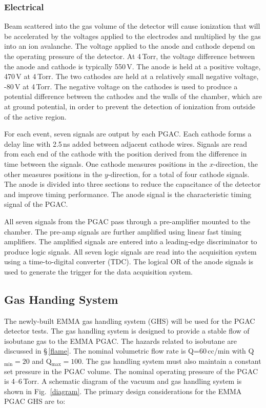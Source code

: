 \subsubsection{Electrical}
Beam scattered into the gas volume of the detector will cause ionization that will be accelerated by the %
 voltages applied to the electrodes and multiplied by the gas into an ion avalanche.
The  voltage applied to the anode and cathode depend on the operating pressure of the detector.  At 4\,Torr, the voltage difference between the anode and cathode is typically 550\,V.  The anode is held at a positive voltage, 470\,V at 4\,Torr.  The two cathodes are held at a relatively small negative voltage, -80\,V at 4\,Torr.  The negative voltage on the cathodes is used to produce a potential difference between the cathodes and the walls of the chamber, which are at ground potential, in order to prevent the detection of ionization from outside of the active region.  

For each event, seven signals are output by each PGAC. Each cathode forms a delay line with 2.5\,ns added between adjacent cathode wires.  Signals are read from each end of the cathode with the position derived from the difference in time between the signals.  One cathode measures positions in the $x$-direction, the other measures positions in the $y$-direction, for a total of four cathode signals.
The anode is divided into three sections to reduce the capacitance of the detector and improve timing performance.  The anode signal is the characteristic timing signal of the PGAC.%

All seven signals from the PGAC pass through a  %
pre-amplifier mounted to the chamber.  The pre-amp signals are further amplified using linear fast timing amplifiers.  The amplified signals are entered into a leading-edge discriminator to produce logic signals.  All seven logic signals are read into the acquisition system using a time-to-digital converter (TDC).  %
The logical OR of the anode signals is used to generate the trigger for the data acquisition system.%


\subsection{Gas Handing System}
The newly-built EMMA gas handling system (GHS) will be used for the PGAC detector tests.
The gas handling system is designed to provide a stable flow of isobutane gas to the EMMA PGAC.  The hazards related to isobutane are discussed in \S\,\ref{flame}. The nominal volumetric flow rate is Q=60\,cc/min with Q$_\textrm{min}=20$ and Q$_\textrm{max}=100$.
The gas handling system must also maintain a constant set pressure  in the PGAC volume. The nominal operating pressure of the PGAC is 4--6\,Torr.
A schematic diagram of the vacuum and gas handling system  is shown in Fig.~\ref{diagram}. 
The primary design considerations for the EMMA PGAC GHS are to:

